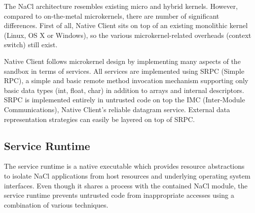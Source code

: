 The NaCl architecture resembles existing micro and hybrid kernels.
However, compared to on-the-metal microkernels, there are number of
significant differences. First of all, Native Client sits on top of an
existing monolithic kernel (\ie Linux, OS X or Windows), so the various
microkernel-related overheads (\eg context switch) still exist.




Native Client follows microkernel design by implementing many aspects
of the sandbox in terms of services. All services are implemented using
SRPC (Simple RPC), a simple and basic remote method invocation
mechanism supporting only basic data types (int, float, char) in
addition to arrays and internal descriptors. SRPC is implemented
entirely in untrusted code on top the IMC (Inter-Module Communications),
Native Client's reliable datagram service. External data representation
strategies can easily be layered on top of SRPC.


\subsection{Service Runtime}

The service runtime is a native executable which provides resource
abstractions to isolate NaCl applications from host resources and
underlying operating system interfaces. Even though it shares a process
with the contained NaCl module, the service runtime prevents untrusted
code from inappropriate accesses using a combination of various
techniques. %

